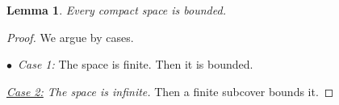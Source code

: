 \documentclass{article}
\newtheorem{lemma}{Lemma}
\begin{document}
\begin{lemma} Every compact space is bounded. \end{lemma}
\begin{proof}
We argue by cases.

$\bullet$\,\,\,{\it Case 1:} The space is finite. Then it is bounded.

{\it \underline{Case 2:} The space is infinite.} Then a finite subcover bounds it.
\end{proof}
\end{document}
